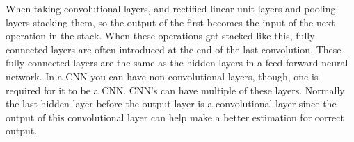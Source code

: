 When taking convolutional layers, and rectified linear unit layers and pooling layers stacking them, so the output of the first becomes the input of the next operation in the stack. When these operations get stacked like this, fully connected layers are often introduced at the end of the last convolution. These fully connected layers are the same as the hidden layers in a feed-forward neural network. In a CNN you can have non-convolutional layers, though, one is required for it to be a CNN. CNN's can have multiple of these layers. Normally the last hidden layer before the output layer is a convolutional layer since the output of this convolutional layer can help make a better estimation for correct output.
